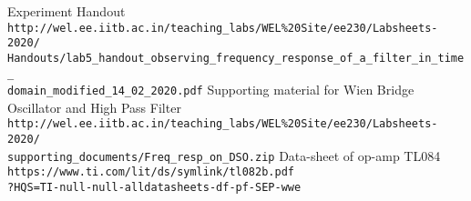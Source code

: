\documentclass[12pt]{article}
\begin{document}
\vspace{4cm}

    \begin{thebibliography}{9}

        Experiment Handout
        \\\texttt{http://wel.ee.iitb.ac.in/teaching\_labs/WEL\%20Site/ee230/Labsheets-2020/\\Handouts/lab5\_handout\_observing\_frequency\_response\_of\_a\_filter\_in\_time\_\\domain\_modified\_14\_02\_2020.pdf}
        Supporting material for Wien Bridge Oscillator and High Pass Filter
        \\\texttt{http://wel.ee.iitb.ac.in/teaching\_labs/WEL\%20Site/ee230/Labsheets-2020/\\supporting\_documents/Freq\_resp\_on\_DSO.zip}
        Data-sheet of op-amp TL084
        \\\texttt{https://www.ti.com/lit/ds/symlink/tl082b.pdf\\?HQS=TI-null-null-alldatasheets-df-pf-SEP-wwe}
        
    \end{thebibliography}
\end{document}

